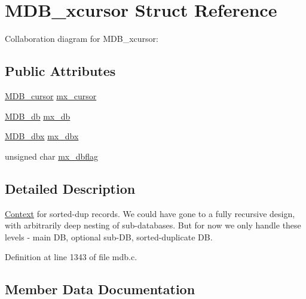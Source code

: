 \hypertarget{struct_m_d_b__xcursor}{}\section{M\+D\+B\+\_\+xcursor Struct Reference}
\label{struct_m_d_b__xcursor}


Collaboration diagram for M\+D\+B\+\_\+xcursor\+:
\subsection*{Public Attributes}
\begin{DoxyCompactItemize}
\item 
\mbox{\hyperlink{struct_m_d_b__cursor}{M\+D\+B\+\_\+cursor}} \mbox{\hyperlink{struct_m_d_b__xcursor_a296385e0aee20fed6c311784459943a5}{mx\+\_\+cursor}}
\item 
\mbox{\hyperlink{struct_m_d_b__db}{M\+D\+B\+\_\+db}} \mbox{\hyperlink{struct_m_d_b__xcursor_a40d92cd9b6d087fd6feb32ef270fc6e8}{mx\+\_\+db}}
\item 
\mbox{\hyperlink{struct_m_d_b__dbx}{M\+D\+B\+\_\+dbx}} \mbox{\hyperlink{struct_m_d_b__xcursor_a7799c836fd4ba7a94943a6be037bbc99}{mx\+\_\+dbx}}
\item 
unsigned char \mbox{\hyperlink{struct_m_d_b__xcursor_a1763a0629d63d352f9f61c1e277304b5}{mx\+\_\+dbflag}}
\end{DoxyCompactItemize}


\subsection{Detailed Description}
\mbox{\hyperlink{struct_context}{Context}} for sorted-\/dup records. We could have gone to a fully recursive design, with arbitrarily deep nesting of sub-\/databases. But for now we only handle these levels -\/ main DB, optional sub-\/\+DB, sorted-\/duplicate DB. 

Definition at line 1343 of file mdb.\+c.



\subsection{Member Data Documentation}
\mbox{\label{struct_m_d_b__xcursor_a296385e0aee20fed6c311784459943a5}} 
